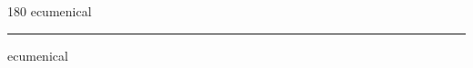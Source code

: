 
\begin{frame}
\begin{center}
\begin{turn}{180}
{\fontsize{2.5cm}{1em}\selectfont ecumenical}
\end{turn}
\vspace{1em}\par  
\hrule
\vspace{1em}\par  
{\fontsize{2.5cm}{1em}\selectfont ecumenical}
\end{center}
\end{frame}
